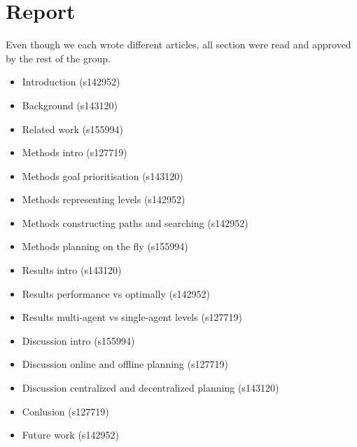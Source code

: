 \documentclass[a4paper]{article}
\newcommand{\jens}{s143120}
\newcommand{\sune}{s155994}
\newcommand{\superdude}{s127719}
\newcommand{\elias}{s142952}
\begin{document}
\section{Report}
Even though we each wrote different articles, all section were read
and approved by the rest of the group.
\begin{itemize}
  \item Introduction (\elias)
  \item Background (\jens)
  \item Related work (\sune)
  \item Methods intro (\superdude)
  \item Methods goal prioritisation (\jens)
  \item Methods representing levels (\elias)
  \item Methods constructing paths and searching (\elias)
  \item Methods planning on the fly (\sune)
  \item Results intro (\jens)
  \item Results performance vs optimally (\elias)
  \item Results multi-agent vs single-agent levels (\superdude)
  \item Discussion intro (\sune)
  \item Discussion online and offline planning (\superdude)
  \item Discussion centralized and decentralized planning (\jens)
  \item Conlusion (\superdude)
  \item Future work (\elias)
\end{itemize}
\end{document}
